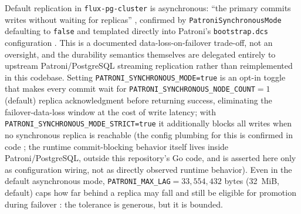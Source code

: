 \begin{remark}
\label{rem:pgcluster-durability}
Default replication in \texttt{flux-\allowbreak{}pg-\allowbreak{}cluster} is asynchronous: ``the primary commits
writes without waiting for replicas'' ,
confirmed by \texttt{Patroni\allowbreak{}Synchronous\allowbreak{}Mode} defaulting to \texttt{false}
 and templated directly into
Patroni's \texttt{bootstrap.dcs} configuration
. This is a documented data-loss-on-failover
trade-off, not an oversight, and the durability semantics themselves are delegated
entirely to upstream Patroni/PostgreSQL streaming replication rather than reimplemented
in this codebase. Setting \texttt{PATRONI\_SYNCHRONOUS\_MODE=\allowbreak{}true} is an opt-in toggle
that makes every commit wait for \texttt{PATRONI\_SYNCHRONOUS\_NODE\_COUNT}$=1$
(default) replica acknowledgment before returning success, eliminating the
failover-data-loss window at the cost of write latency; with
\texttt{PATRONI\_SYNCHRONOUS\_MODE\_STRICT=\allowbreak{}true} it additionally blocks all writes when
no synchronous replica is reachable  (the
config plumbing for this is confirmed in code
; the runtime
commit-blocking behavior itself lives inside Patroni/PostgreSQL, outside this
repository's Go code, and is asserted here only as configuration wiring, not as
directly observed runtime behavior). Even in the default asynchronous mode,
\texttt{PATRONI\_MAX\_LAG}$=33{,}554{,}432$ bytes (32~MiB, default) caps how far behind
a replica may fall and still be eligible for promotion during failover
: the tolerance is generous, but it is
bounded.
\end{remark}

